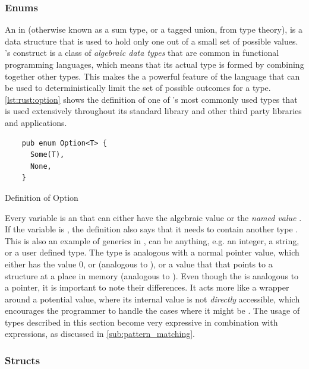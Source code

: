 \subsubsection{Enums}

An {\enum} in {\rust} (otherwise known as a sum type, or a tagged union, from type theory), is a data structure that is used to hold only one out of a small set of possible values.
\rust's {\enum} construct is a class of \emph{algebraic data types} that are common in functional programming languages, which means that its actual type is formed by combining together other types.
This makes the {\enum} a powerful feature of the language that can be used to deterministically limit the set of possible outcomes for a type.
\autoref{lst:rust:option} shows the definition of one of {\rust}'s most commonly used types that is used extensively throughout its standard library and other third party libraries and applications.

\begin{listing}[H]
  \begin{verbatim}
    pub enum Option<T> {
      Some(T),
      None,
    }
  \end{verbatim}
  \caption{Definition of Option}
  \label{lst:rust:option}
\end{listing}

Every  variable is an {\enum} that can either have the algebraic value  or the \emph{named value} .
If the variable is , the definition also says that it needs to contain another type .
This is also an example of generics in {\rust},  can be anything, e.g. an integer, a string, or a user defined type.
The  type is analogous with a normal {\C} pointer value, which either has the value 0, or  (analogous to ), or a value that that points to a structure at a place in memory (analogous to ).
Even though the  is analogous to a {\C} pointer, it is important to note their differences.
It acts more like a wrapper around a potential value, where its internal value is not \emph{directly} accessible, which encourages the programmer to handle the cases where it might be .
The usage of {\enum} types described in this section become very expressive in combination with  expressions, as discussed in \autoref{sub:pattern_matching}.

\subsubsection{Structs}
\label{ssub:structs}


